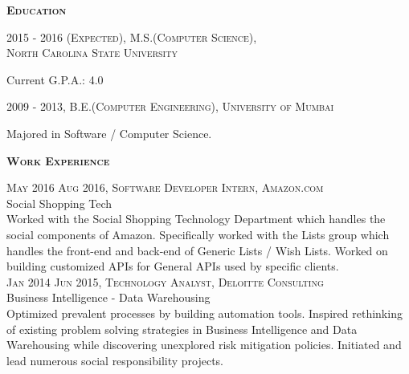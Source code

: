\documentclass[letterpaper,12pt,final]{memoir}
\newcommand{\Sep}{\vspace{1.5em}}
\newcommand{\SmallSep}{\vspace{0.5em}}
\newenvironment{Objective}
	{\ignorespaces\textbf{\color{Plum} Objective}}
	{\Sep\ignorespacesafterend}
\newcommand{\CVSection}[1]
	{\Large\textbf{\textsc{{#1}}}\par
	\SmallSep\normalsize\normalfont}
\newcommand{\CVItem}[1]
	{\textsc{\color{Plum} #1}}
\begin{document}
\normalsize\normalfont


\CVSection{Education}
\CVItem{2015 - 2016 (Expected), M.S.(Computer Science),\\ North \hyphenchar\font=-1 Carolina State University}\\
\begin{footnotesize}
	Current G.P.A.: 4.0
\end{footnotesize}
\SmallSep

\CVItem{2009 - 2013, B.E.(Computer Engineering), University of \allowbreak  Mumbai}\\
 \begin{footnotesize}
 	Majored in Software / Computer Science.
 \end{footnotesize}
\SmallSep

\CVSection{Work Experience}
\CVItem{May 2016 \textendash \space Aug 2016, Software Developer Intern, Amazon.com}\\
\SmallSep
Social Shopping Tech\\
{\footnotesize Worked with the Social Shopping Technology Department which handles the social components of Amazon. Specifically worked with the Lists group which handles the front-end and back-end of Generic Lists / Wish Lists. Worked on building customized APIs for General APIs used by specific clients.}
\SmallSep\\
\CVItem{Jan 2014 \textendash \space Jun 2015, Technology Analyst, Deloitte Consulting}\\
\SmallSep
Business Intelligence - Data Warehousing\\
{\footnotesize Optimized prevalent processes by building automation tools. Inspired rethinking of existing problem solving strategies in Business Intelligence and Data Warehousing while discovering unexplored risk mitigation policies. Initiated and lead numerous social responsibility projects.}
\SmallSep
\end{document}

